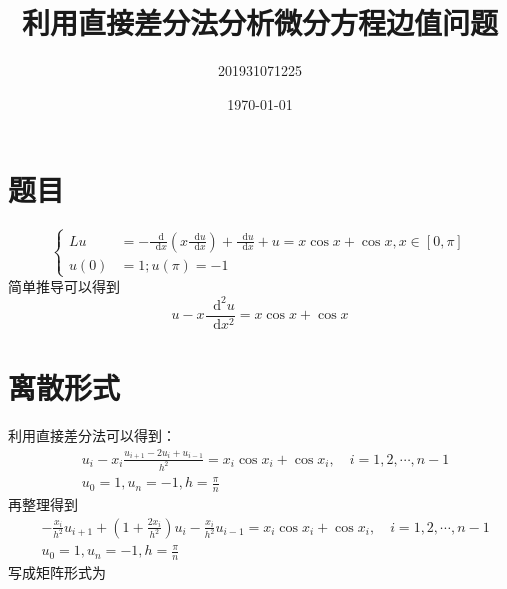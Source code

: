 \documentclass{ctexart}
\author{201931071225\quad 201931071332}
\date{\today}
\title{利用直接差分法分析微分方程边值问题}
\numberwithin{equation}{section}    %
\newcommand*{\dif}{\mathop{}\!\mathrm{d}}
\begin{document}
\maketitle
\tableofcontents
\newpage
\section{题目}
\begin{equation}
    \left\{\begin{aligned}
            L u&=-\frac{\dif}{\dif x}\left(x \frac{\dif u}{\dif x}\right)+\frac{\dif u}{\dif x}+u=x \cos x+\cos x, x \in[0, \pi] \\
            u(0)&=1; u(\pi)=-1
    \end{aligned}\right.
\end{equation}
简单推导可以得到
\begin{equation}
    u- x\frac{\dif^2u}{\dif x^2}= x\cos x+\cos x
\end{equation}
\section{离散形式}
利用直接差分法可以得到：
\begin{equation}
    \begin{aligned}
    &u_i - x_i\frac{u_{i+1}-2u_i+u_{i-1}}{h^2}=x_i\cos x_i+\cos x_i,\quad i = 1,2,\cdots,n-1\\
    &u_0 = 1,u_n=-1,h = \frac{\pi}{n}
    \end{aligned}
\end{equation}
再整理得到
\begin{equation}
    \begin{aligned}
    &-\frac{x_i}{h^2}u_{i+1}+(1+\frac{2x_i}{h^2})u_i-\frac{x_i}{h^2}u_{i-1}=x_i\cos x_i+\cos x_i,\quad i = 1,2,\cdots,n-1\\
    &u_0 = 1,u_n=-1,h = \frac{\pi}{n}
    \end{aligned}
\end{equation}
写成矩阵形式为
\end{document}
